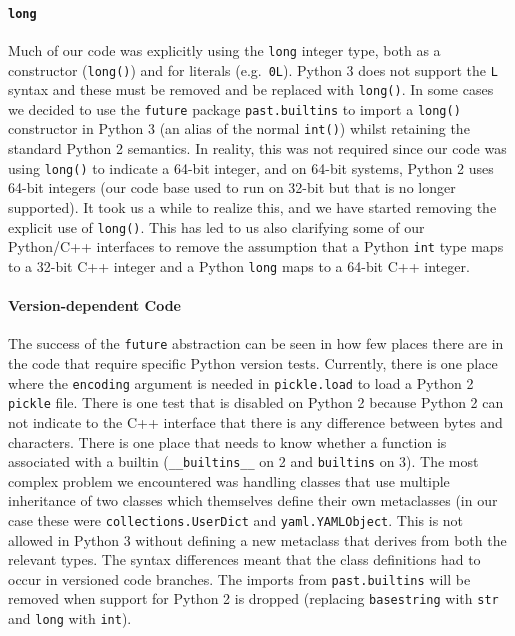 \documentclass[11pt,twoside]{article}
\begin{document}
\paragraph{\texttt{long}}

Much of our code was explicitly using the \texttt{long} integer type, both as a constructor (\texttt{long()}) and for literals (e.g.\ \texttt{0L}).
Python 3 does not support the \texttt{L} syntax and these must be removed and be replaced with \texttt{long()}.
In some cases we decided to use the \texttt{future} package \texttt{past.builtins} to import a \texttt{long()} constructor in Python 3 (an alias of the normal \texttt{int()}) whilst retaining the standard Python 2 semantics.
In reality, this was not required since our code was using \texttt{long()} to indicate a 64-bit integer, and on 64-bit systems, Python 2 uses 64-bit integers (our code base used to run on 32-bit but that is no longer supported).
It took us a while to realize this, and we have started removing the explicit use of \texttt{long()}.
This has led to us also clarifying some of our Python/C++ interfaces to remove the assumption that a Python \texttt{int} type maps to a 32-bit C++ integer and a Python \texttt{long} maps to a 64-bit C++ integer.

\paragraph{Version-dependent Code}

The success of the \texttt{future} abstraction can be seen in how few places there are in the code that require specific Python version tests.
Currently, there is one place where the \texttt{encoding} argument is needed in \texttt{pickle.load} to load a Python 2 \texttt{pickle} file.
There is one test that is disabled on Python 2 because Python 2 can not indicate to the C++ interface that there is any difference between bytes and characters.
There is one place that needs to know whether a function is associated with a builtin (\texttt{\_\_builtins\_\_} on 2 and \texttt{builtins} on 3).
The most complex problem we encountered was handling classes that use multiple inheritance of two classes which themselves define their own metaclasses (in our case these were \texttt{collections.UserDict} and \texttt{yaml.YAMLObject}.
This is not allowed in Python 3 without defining a new metaclass that derives from both the relevant types.
The syntax differences meant that the class definitions had to occur in versioned code branches.
The imports from \texttt{past.builtins} will be removed when support for Python 2 is dropped (replacing \texttt{basestring} with \texttt{str} and \texttt{long} with \texttt{int}).
\end{document}
